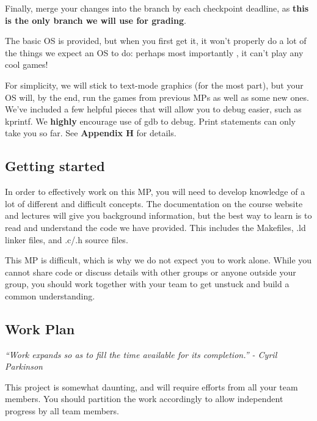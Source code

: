 \documentclass{article}
\begin{document}
Finally, merge your changes into the {} branch by each checkpoint deadline, as \textbf{this is the only branch we will use for grading}.

\bigbreak{}


The basic OS is provided, but when you first get it, it won't properly
do a lot of the things we expect an OS to do: perhaps most
importantly ,
it can't play any cool games!

For simplicity, we will stick to text-mode graphics (for the most part),
but your OS will, by the end, run the games from previous MPs as well as some 
new ones. We've included a few helpful pieces that will allow you to debug easier,
such as {\fix kprintf}. We \textbf{highly} encourage use of gdb to debug. Print
statements can only take you so far. See \textbf{Appendix H} for details.\\

\subsection{Getting started}

In order to effectively work on this MP, you will need to develop knowledge of a lot of 
different and difficult concepts. The documentation on the course website and lectures will 
give you background information, but the best way to learn is to read and understand the 
code we have provided. This includes the {\fix Makefiles}, {\fix .ld} linker files, and {\fix .c/.h} source files.

This MP is difficult, which is why we do not expect you to work alone. While
you cannot share code or discuss details with other groups or anyone outside
your group, you should work together with your team to get unstuck and build
a common understanding.

\subsection{Work Plan}

\emph{``Work expands so as to fill the time available for its completion.'' - Cyril Parkinson}

This project is somewhat daunting, and will require efforts from all your
team members. You should partition the work accordingly to allow independent progress 
by all team members.
\end{document}
